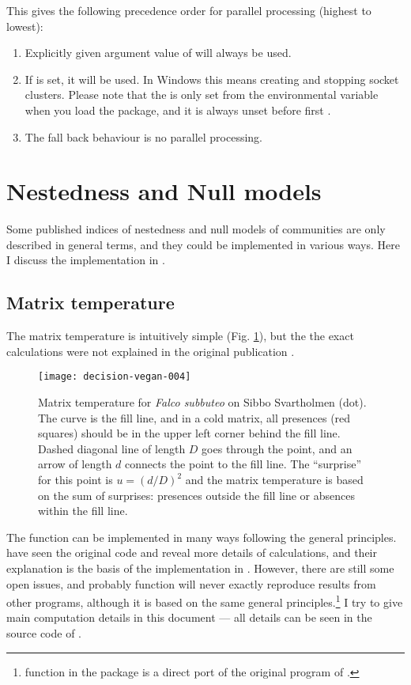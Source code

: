 \documentclass[a4paper,10pt,twocolumn]{article}
\begin{document}
This gives the following precedence order for parallel processing
(highest to lowest):
\begin{enumerate}
  \item Explicitly given argument value of  will always
    be used.
  \item If  is set, it will be used. In Windows this
    means creating and stopping socket clusters. Please note
    that the  is only set from the environmental
    variable  when you load the  package,
    and it is always unset before first
    .
 \item The fall back behaviour is no parallel processing. 
\end{enumerate}

\section{Nestedness and Null models}

Some published indices of nestedness and null models of communities
are only described in general terms, and they could be implemented in
various ways. Here I discuss the implementation in .

\subsection{Matrix temperature}

The matrix temperature is intuitively simple
(Fig. \ref{fig:nestedtemp}), but the the exact calculations were not
explained in the original publication \cite{AtmarPat93}.
\begin{figure}
\texttt{[image: decision-vegan-004]}
\label{fig:nestedtemp}
\caption{Matrix temperature for \emph{Falco subbuteo} on Sibbo
  Svartholmen (dot). The curve is the fill line, and in a cold
  matrix, all presences (red squares) should be in the upper left
  corner behind the fill line. Dashed diagonal line of length $D$ goes
  through the point, and an arrow of length $d$ connects the point to
  the fill line. The ``surprise'' for this point is $u = (d/D)^2$ and
  the matrix temperature is based on the sum of surprises: presences
  outside the fill line or absences within the fill line.}
\end{figure}
The function can be implemented in many ways following the general
principles.  \citet{RodGir06} have seen the original code and reveal
more details of calculations, and their explanation is the basis of
the implementation in .  However, there are still some open
issues, and probably  function  will never
exactly reproduce results from other programs, although it is based on
the same general principles.\footnote{function  in
  the  package is a direct port of the original
   program of \citet{RodGir06}.}  I try to give
main computation details in this document --- all details can be seen
in the source code of .
\end{document}
